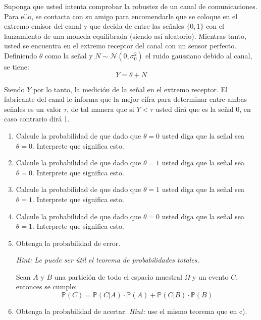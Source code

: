 \documentclass[
  11pt,
  letterpaper,
   addpoints,
  answers
  ]{exam}
\begin{document}
\begin{questions}
\question Suponga que usted intenta comprobar la robustez de un canal de comunicaciones. Para ello, se contacta con su amigo para encomendarle que se coloque en el extremo emisor del canal y que decida de entre las señales $\{0,1\}$ con el lanzamiento de una moneda equilibrada (siendo así aleatorio). Mientras tanto, usted se encuentra en el extremo receptor del canal con un sensor perfecto. Definiendo $\theta$ como la señal y $N \sim \mathcal{N}(0, \sigma_0^2)$ el ruido gaussiano debido al canal, se tiene:
\begin{equation}
Y = \theta + N
\end{equation}

Siendo $Y$ por lo tanto, la medición de la señal en el extremo receptor. El fabricante del canal le informa que la mejor cifra para determinar entre ambas señales es un valor $\tau$, de tal manera que si $Y < \tau$ usted dirá que es la señal 0, en caso contrario dirá 1.

\begin{enumerate}
    \item Calcule la probabilidad de que dado que $\theta = 0$ usted diga que la señal sea $\theta = 0$. Interprete que significa esto.
    
    \item Calcule la probabilidad de que dado que $\theta = 1$ usted diga que la señal sea $\theta = 0$. Interprete que significa esto.
    
    \item Calcule la probabilidad de que dado que $\theta = 1$ usted diga que la señal sea $\theta = 1$. Interprete que significa esto.
    
    \item Calcule la probabilidad de que dado que $\theta = 0$ usted diga que la señal sea $\theta = 1$. Interprete que significa esto.
    
    \item Obtenga la probabilidad de error.
    
    \textit{Hint: Le puede ser útil el teorema de probabilidades totales.}
    
    Sean $A$ y $B$ una partición de todo el espacio muestral $\Omega$ y un evento $C$, entonces se cumple:
    \begin{equation}
    \mathbb{P}(C) = \mathbb{P}(C|A) \cdot \mathbb{P}(A) + \mathbb{P}(C|B) \cdot \mathbb{P}(B)
    \end{equation}
    
    \item Obtenga la probabilidad de acertar. \textit{Hint:} use el mismo teorema que en c).
    

\end{enumerate}
\end{questions}
\end{document}
